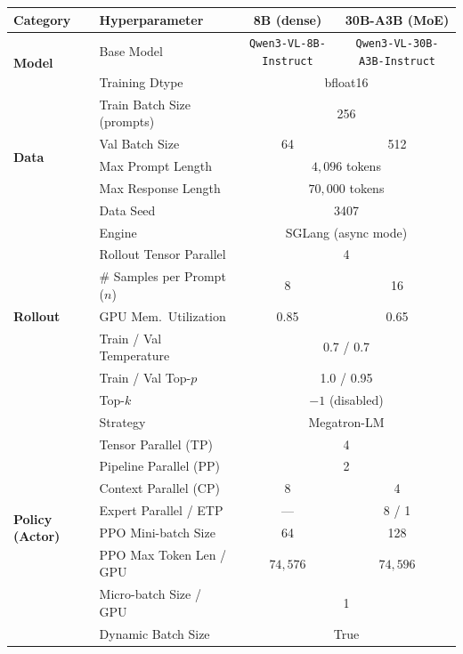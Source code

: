 \begin{table}[!tbp]
\centering
\small
\setlength{\tabcolsep}{4pt}
\renewcommand{\arraystretch}{1.1}
\setlength{\abovecaptionskip}{14pt}
\begin{tabular}{@{}l l c c@{}}
\toprule
\textbf{Category} & \textbf{Hyperparameter} & \textbf{8B (dense)} & \textbf{30B-A3B (MoE)} \\
\midrule
\multirow{2}{*}{\textbf{Model}}
& Base Model & \texttt{Qwen3-VL-8B-Instruct} & \texttt{Qwen3-VL-30B-A3B-Instruct} \\
& Training Dtype & \multicolumn{2}{c}{bfloat16} \\
\midrule
\multirow{5}{*}{\textbf{Data}}
& Train Batch Size (prompts) & \multicolumn{2}{c}{256} \\
& Val Batch Size & 64 & 512 \\
& Max Prompt Length & \multicolumn{2}{c}{$4{,}096$ tokens} \\
& Max Response Length & \multicolumn{2}{c}{$70{,}000$ tokens} \\
& Data Seed & \multicolumn{2}{c}{3407} \\
\midrule
\multirow{7}{*}{\textbf{Rollout}}
& Engine & \multicolumn{2}{c}{SGLang (async mode)} \\
& Rollout Tensor Parallel & \multicolumn{2}{c}{4} \\
& \# Samples per Prompt ($n$) & 8 & 16 \\
& GPU Mem.\ Utilization & 0.85 & 0.65 \\
& Train / Val Temperature & \multicolumn{2}{c}{0.7 / 0.7} \\
& Train / Val Top-$p$ & \multicolumn{2}{c}{1.0 / 0.95} \\
& Top-$k$ & \multicolumn{2}{c}{$-1$ (disabled)} \\
\midrule
\multirow{11}{*}{\textbf{Policy (Actor)}}
& Strategy & \multicolumn{2}{c}{Megatron-LM} \\
& Tensor Parallel (TP) & \multicolumn{2}{c}{4} \\
& Pipeline Parallel (PP) & \multicolumn{2}{c}{2} \\
& Context Parallel (CP) & 8 & 4 \\
& Expert Parallel / ETP & --- & 8 / 1 \\
& PPO Mini-batch Size & 64 & 128 \\
& PPO Max Token Len / GPU & $74{,}576$ & $74{,}596$ \\
& Micro-batch Size / GPU & \multicolumn{2}{c}{1} \\
& Dynamic Batch Size & \multicolumn{2}{c}{True} \\

\end{tabular}
\end{table}
